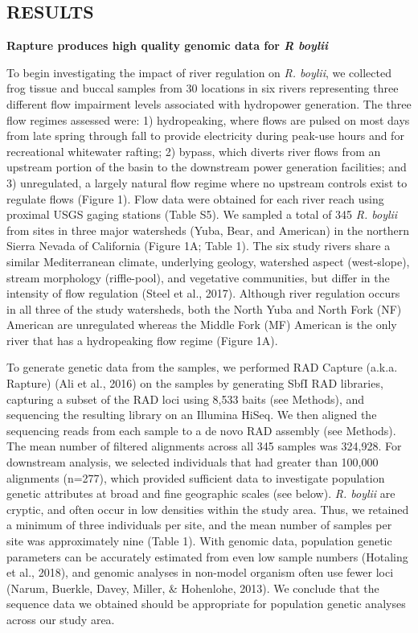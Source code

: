\documentclass[proquest,12pt,final]{ucthesis-CA2012} %
\begin{document}
\begin{ucmainmatter}
\clearpage

\hypertarget{results}{%
\section{RESULTS}\label{results}}

\textbf{Rapture produces high quality genomic data for \emph{R boylii} }

To begin investigating the impact of river regulation on \emph{R.
boylii}, we collected frog tissue and buccal samples from 30 locations
in six rivers representing three different flow impairment levels
associated with hydropower generation. The three flow regimes assessed
were: 1) hydropeaking, where flows are pulsed on most days from late
spring through fall to provide electricity during peak-use hours and for
recreational whitewater rafting; 2) bypass, which diverts river flows
from an upstream portion of the basin to the downstream power generation
facilities; and 3) unregulated, a largely natural flow regime where no
upstream controls exist to regulate flows (Figure 1). Flow data were
obtained for each river reach using proximal USGS gaging stations (Table
S5). We sampled a total of 345 \emph{R. boylii} from sites in three
major watersheds (Yuba, Bear, and American) in the northern Sierra
Nevada of California (Figure 1A; Table 1). The six study rivers share a
similar Mediterranean climate, underlying geology, watershed aspect
(west-slope), stream morphology (riffle-pool), and vegetative
communities, but differ in the intensity of flow regulation (Steel et
al., 2017). Although river regulation occurs in all three of the study
watersheds, both the North Yuba and North Fork (NF) American are
unregulated whereas the Middle Fork (MF) American is the only river that
has a hydropeaking flow regime (Figure 1A).

To generate genetic data from the samples, we performed RAD Capture
(a.k.a. Rapture) (Ali et al., 2016) on the samples by generating SbfI
RAD libraries, capturing a subset of the RAD loci using 8,533 baits (see
Methods), and sequencing the resulting library on an Illumina HiSeq. We
then aligned the sequencing reads from each sample to a de novo RAD
assembly (see Methods). The mean number of filtered alignments across
all 345 samples was 324,928. For downstream analysis, we selected
individuals that had greater than 100,000 alignments (n=277), which
provided sufficient data to investigate population genetic attributes at
broad and fine geographic scales (see below). \emph{R. boylii} are
cryptic, and often occur in low densities within the study area. Thus,
we retained a minimum of three individuals per site, and the mean number
of samples per site was approximately nine (Table 1). With genomic data,
population genetic parameters can be accurately estimated from even low
sample numbers (Hotaling et al., 2018), and genomic analyses in
non-model organism often use fewer loci (Narum, Buerkle, Davey, Miller,
\& Hohenlohe, 2013). We conclude that the sequence data we obtained
should be appropriate for population genetic analyses across our study
area.


\end{ucmainmatter}
\end{document}
